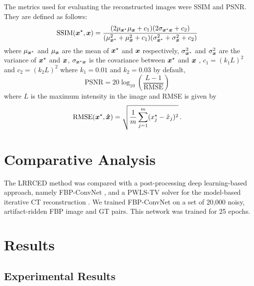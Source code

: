 The metrics used for evaluating the reconstructed images were \ac{SSIM} and \ac{PSNR}. They are defined as follows:
\begin{equation}
\mathrm{SSIM}(\bm{x}^\star,\bm{x}) = \frac{(2\mu_{\bm{x}^\star}\mu_{\bm{x}}+c_{1})(2\sigma_{\bm{x}^\star\bm{x}}+c_{2})}{(\mu_{\bm{x}^\star}^2+\mu_{\bm{x}}^2+c_{1})(\sigma_{\bm{x}^\star}^2+\sigma_{\bm{x}}^2+c_{2})}   
\end{equation}
where $\mu_{\bm{x}^\star}$ and $\mu_{\bm{x}}$ are the mean of $\bm{x}^\star$ and $\bm{x}$ respectively, $\sigma_{\bm{x}^\star}^2$ and $\sigma_{\bm{x}}^2$ are the variance of $\bm{x}^\star$ and $\bm{x}$, $\sigma_{\bm{x}^\star\bm{x}}$ is the covariance between $\bm{x}^\star$ and $\bm{x}$ , $c_{1}=(k_{1}L)^2$ and $c_{2}=(k_{2}L)^2$ where $k_{1}=0.01$ and $k_{2}=0.03$ by default,
\begin{equation}
\mathrm{PSNR} = 20\log_{10}\left(\frac{L-1}{\mathrm{RMSE}}\right)
\end{equation}
where $L$ is the maximum intensity in the image and \ac{RMSE} is given by
\begin{equation}
\mathrm{RMSE}(\bm{x}^\star,\bm{\hat{x}}) = \sqrt{\frac{1}{m}   \sum_{j=1}^{m} (x^\star_j-\hat{x}_j )^2} \, .
\end{equation}



\section{Comparative Analysis}

The  \ac{LRRCED} method was compared with a post-processing deep learning-based approach, namely FBP-ConvNet \cite{jin2017deep}, and a \ac{PWLS}-\ac{TV} solver for the model-based iterative \ac{CT} reconstruction \cite{tang2009performance}. We trained FBP-ConvNet on a set of 20,000 noisy, artifact-ridden \ac{FBP} image and \ac{GT} pairs. This network was trained for 25 epochs. 

\section{Results} \label{sec:results}

\subsection{Experimental Results}

